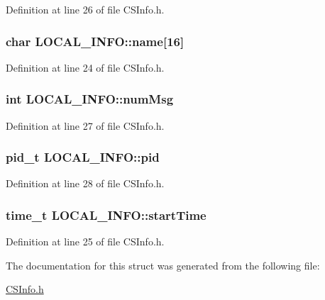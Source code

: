 Definition at line 26 of file CSInfo.h.\hypertarget{structLOCAL__INFO_af1d8383727925dd359e68693c6a048df}{
\subsubsection[{name}]{\setlength{\rightskip}{0pt plus 5cm}char {\bf LOCAL\_\-INFO::name}\mbox{[}16\mbox{]}}}
\label{structLOCAL__INFO_af1d8383727925dd359e68693c6a048df}


Definition at line 24 of file CSInfo.h.\hypertarget{structLOCAL__INFO_a880a5e2ed0fe6cad60a3060b0d5ffcb7}{
\subsubsection[{numMsg}]{\setlength{\rightskip}{0pt plus 5cm}int {\bf LOCAL\_\-INFO::numMsg}}}
\label{structLOCAL__INFO_a880a5e2ed0fe6cad60a3060b0d5ffcb7}


Definition at line 27 of file CSInfo.h.\hypertarget{structLOCAL__INFO_a3fa05f286f9dde4c31ab820ad98a2b7d}{
\subsubsection[{pid}]{\setlength{\rightskip}{0pt plus 5cm}pid\_\-t {\bf LOCAL\_\-INFO::pid}}}
\label{structLOCAL__INFO_a3fa05f286f9dde4c31ab820ad98a2b7d}


Definition at line 28 of file CSInfo.h.\hypertarget{structLOCAL__INFO_addc585a8acd1c8a464fceb17fec9791a}{
\subsubsection[{startTime}]{\setlength{\rightskip}{0pt plus 5cm}time\_\-t {\bf LOCAL\_\-INFO::startTime}}}
\label{structLOCAL__INFO_addc585a8acd1c8a464fceb17fec9791a}


Definition at line 25 of file CSInfo.h.

The documentation for this struct was generated from the following file:\begin{DoxyCompactItemize}
\item 
\hyperlink{CSInfo_8h}{CSInfo.h}\end{DoxyCompactItemize}
